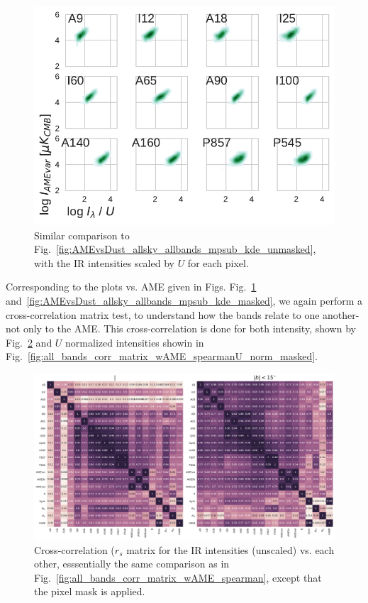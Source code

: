             \begin{figure}
              \includegraphics[width=\textwidth]{../Plots/ch_allsky/AMEvsDust_allsky_allbands_mpsub_UNorm_kde_masked.pdf}
              \centering
              \caption{Similar comparison to Fig.~\ref{fig:AMEvsDust_allsky_allbands_mpsub_kde_unmasked}, with the IR intensities scaled by $U$ for each pixel. }
              \label{fig:AMEvsDust_allsky_allbands_mpsub_UNorm_kde_masked}
            \end{figure}
          Corresponding to the plots vs. AME given in Figs. Fig.~\ref{fig:AMEvsDust_allsky_allbands_mpsub_UNorm_kde_masked} and~\ref{fig:AMEvsDust_allsky_allbands_mpsub_kde_masked}, we again perform a cross-correlation matrix test, to understand how the bands relate to one another- not only to the AME. This cross-correlation is done for both intensity, shown by Fig.~\ref{fig:all_bands_corr_matrix_wAME_spearmanintensity_maskall} and $U$ normalized intensities showin in Fig.~\ref{fig:all_bands_corr_matrix_wAME_spearmanU_norm_masked}.
            \begin{figure}
              \includegraphics[width=\textwidth]{../Plots/ch_allsky/all_bands_corr_matrix_wAME_spearmanintensity_maskall.pdf}
              \centering
              \caption{Cross-correlation ($r_{s}$ matrix for the IR intensities (unscaled) vs. each other, esssentially the same comparison as in Fig.~\ref{fig:all_bands_corr_matrix_wAME_spearman}, except that the pixel mask is applied.}
              \label{fig:all_bands_corr_matrix_wAME_spearmanintensity_maskall}
            \end{figure}
